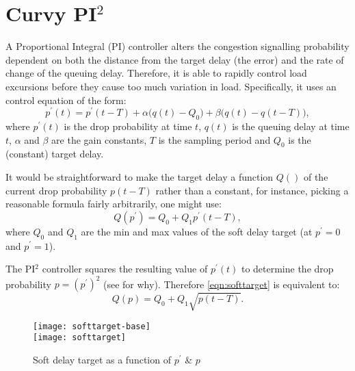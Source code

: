 
\section{Curvy PI\(^2\)}\label{softtargettr_curvy-pi}

A Proportional Integral (PI) controller alters the congestion signalling probability dependent on both the distance from the target delay (the error) and the rate of change of the queuing delay. Therefore, it is able to rapidly control load excursions before they cause too much variation in load. Specifically, it uses an control equation of the form:
\begin{equation*}
	p^\prime(t) = p^\prime(t-T) + \alpha\big(q(t)-Q_0\big) + \beta\big(q(t)-q(t-T)\big),\label{eqn:pi}
\end{equation*}
where \(p^\prime(t)\) is the drop probability at time \(t\), \(q(t)\) is the queuing delay at time \(t\),  \(\alpha\) and \(\beta\) are the gain constants, \(T\) is the sampling period and \(Q_0\) is the (constant) target delay.

It would be straightforward to make the target delay a function \(Q()\) of the current drop probability \(p(t-T)\) rather than a constant, for instance, picking a reasonable formula fairly arbitrarily, one might use:
\begin{equation}
	Q(p^\prime) = Q_0 + Q_1 p^\prime(t-T),\label{eqn:softtarget-base}
\end{equation}
where \(Q_0\) and \(Q_1\) are the min and max values of the soft delay target (at \(p^\prime = 0\) and \(p^\prime = 1\)).

The PI\(^2\) controller squares the resulting value of \(p^\prime(t)\) to determine the drop probability \(p = (p^\prime)^2\) (see \cite{DeSchepper16a:PI2} for why). Therefore \autoref{eqn:softtarget} is equivalent to:
\begin{equation}
	Q(p) = Q_0 + Q_1 \sqrt{p(t-T)}.\label{eqn:softtarget}
\end{equation}

\begin{figure}
	\centering
	\texttt{[image: softtarget-base]}\\
	\texttt{[image: softtarget]}	
	\caption{Soft delay target as a function of \(p^\prime\) \& \(p\)}\label{fig:softtarget}
\end{figure}

